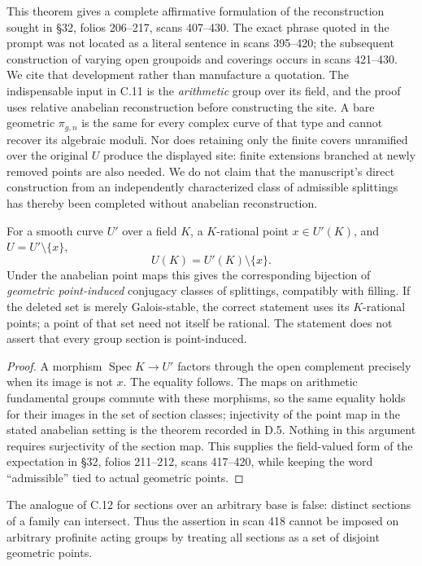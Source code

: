 This theorem gives a complete affirmative formulation of the
reconstruction sought in \S32, folios 206--217, scans 407--430.
The exact phrase quoted in the prompt was not located as a
literal sentence in scans 395--420; the subsequent construction
of varying open groupoids and coverings occurs in scans
421--430.  We cite that development rather than manufacture
a quotation.  The indispensable input in C.11 is the
\emph{arithmetic} group over its field, and the proof uses
relative anabelian reconstruction before constructing the
site.  A bare geometric $\pi_{g,n}$ is the same for every
complex curve of that type and cannot recover its algebraic
moduli.  Nor does retaining only the finite covers unramified
over the original $U$ produce the displayed site: finite
extensions branched at newly removed points are also needed.
We do not claim that the manuscript's direct construction
from an independently characterized class of admissible
splittings has thereby been completed without anabelian
reconstruction.

For a smooth curve $U'$ over a field $K$, a $K$-rational point
$x\in U'(K)$, and $U=U'\setminus\{x\}$,
\[
 U(K)=U'(K)\setminus\{x\}.
\]
Under the anabelian point maps this gives the corresponding
bijection of \emph{geometric point-induced} conjugacy classes
of splittings, compatibly with filling.  If the deleted set
is merely Galois-stable, the correct statement uses its
$K$-rational points; a point of that set need not itself be
rational.  The statement does not assert that every group
section is point-induced.

\begin{proof}
A morphism $\operatorname{Spec}K\to U'$ factors through the
open complement precisely when its image is not $x$.
The equality follows.  The maps on arithmetic fundamental
groups commute with these morphisms, so the same equality
holds for their images in the set of section classes;
injectivity of the point map in the stated anabelian setting
is the theorem recorded in D.5.  Nothing in this argument
requires surjectivity of the section map.  This supplies
the field-valued form of the expectation in \S32, folios
211--212, scans 417--420, while keeping the word
``admissible'' tied to actual geometric points.
\end{proof}

The analogue of C.12 for sections over an arbitrary base is
false: distinct sections of a family can intersect.  Thus
the assertion in scan 418 cannot be imposed on arbitrary
profinite acting groups by treating all sections as a
set of disjoint geometric points.

